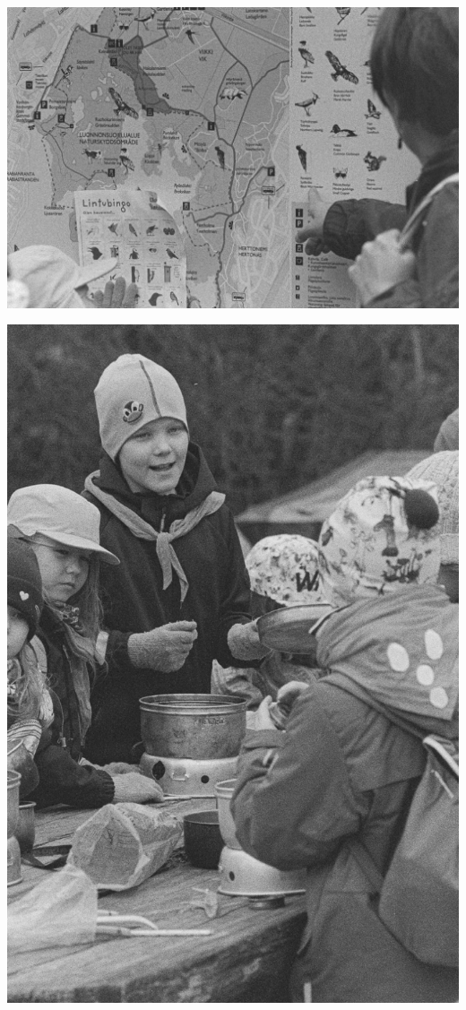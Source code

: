 \begin{multicols}{2}
	\vspace*{0.16cm}
	\noindent\includegraphics[width=\linewidth]{assets/kolkkienpäiväretkibw1}

	\columnbreak

	\vspace*{-0.64cm}
	\noindent\includegraphics[width=\linewidth]{assets/kolkkienpäiväretkibw2}


\end{multicols}
